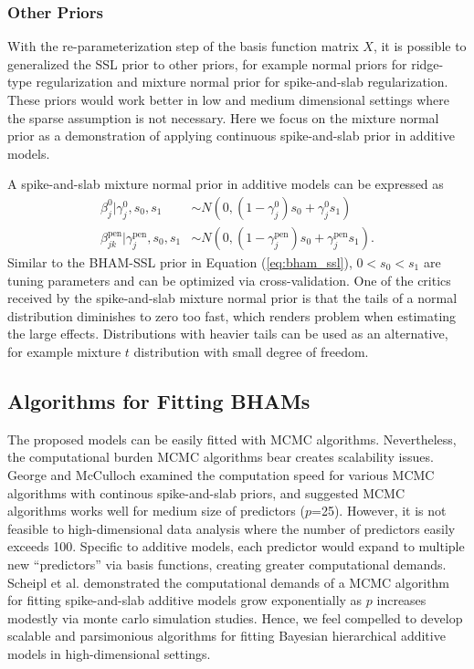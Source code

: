 \documentclass[AMA,STIX1COL,]{WileyNJD-v2}
\begin{document}
\hypertarget{other-priors}{%
\subsubsection{Other Priors}\label{other-priors}}

With the re-parameterization step of the basis function matrix \(X\), it
is possible to generalized the SSL prior to other priors, for example
normal priors for ridge-type regularization and mixture normal prior for
spike-and-slab regularization. These priors would work better in low and
medium dimensional settings where the sparse assumption is not
necessary. Here we focus on the mixture normal prior as a demonstration
of applying continuous spike-and-slab prior in additive models.

A spike-and-slab mixture normal prior in additive models can be
expressed as \[
\begin{aligned}
  \beta^0_{j} |\gamma^0_{j},s_0,s_1 &\sim N(0,(1-\gamma^0_{j}) s_0 + \gamma^0_{j} s_1)\nonumber\\
  \beta^\text{pen}_{jk} | \gamma^\text{pen}_{j},s_0,s_1 &\sim N(0,(1-\gamma^\text{pen}_{j}) s_0 + \gamma^\text{pen}_{j} s_1).
\end{aligned}
\] Similar to the BHAM-SSL prior in Equation (\ref{eq:bham_ssl}),
\(0 < s_0 < s_1\) are tuning parameters and can be optimized via
cross-validation. One of the critics received by the spike-and-slab
mixture normal prior is that the tails of a normal distribution
diminishes to zero too fast, which renders problem when estimating the
large effects. Distributions with heavier tails can be used as an
alternative, for example mixture \(t\) distribution with small degree of
freedom.

\hypertarget{algorithms-for-fitting-bhams}{%
\subsection{Algorithms for Fitting
BHAMs}\label{algorithms-for-fitting-bhams}}

The proposed models can be easily fitted with MCMC algorithms.
Nevertheless, the computational burden MCMC algorithms bear creates
scalability issues. George and McCulloch\citep{George1997} examined the
computation speed for various MCMC algorithms with continous
spike-and-slab priors, and suggested MCMC algorithms works well for
medium size of predictors (\(p\)=25). However, it is not feasible to
high-dimensional data analysis where the number of predictors easily
exceeds 100. Specific to additive models, each predictor would expand to
multiple new ``predictors'' via basis functions, creating greater
computational demands. Scheipl et al. \citep{Scheipl2013} demonstrated
the computational demands of a MCMC algorithm for fitting spike-and-slab
additive models grow exponentially as \(p\) increases modestly via monte
carlo simulation studies. Hence, we feel compelled to develop scalable
and parsimonious algorithms for fitting Bayesian hierarchical additive
models in high-dimensional settings.
\end{document}
